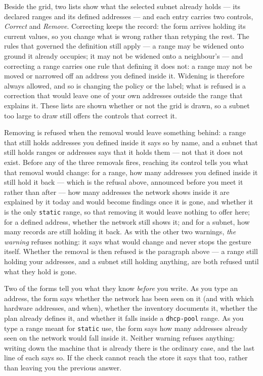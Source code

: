 \documentclass[11pt,oneside,listof=totoc,bibliography=totoc]{scrreprt}
\begin{document}
Beside the grid, two lists show what the selected subnet already holds --- its declared ranges and
its defined addresses --- and each entry carries two controls, \emph{Correct} and \emph{Remove}.
Correcting keeps the record: the form arrives holding its current values, so you change what is
wrong rather than retyping the rest. The rules that governed the definition still apply --- a range
may be widened onto ground it already occupies; it may not be widened onto a neighbour's --- and
correcting a range carries one rule that defining it does not: a range may not be moved or narrowed
off an address you defined inside it. Widening is therefore always allowed, and so is changing the
policy or the label; what is refused is a correction that would leave one of your own addresses
outside the range that explains it. These lists are
shown whether or not the grid is drawn, so a subnet too large to draw still offers the controls that
correct it.

Removing is refused when the removal would leave something behind: a range that still holds
addresses you defined inside it says so by name, and a subnet that still holds ranges or addresses
says that it holds them --- not that it does not exist. Before any of the three removals fires,
reaching its control tells you what that removal would change: for a range, how many addresses you
defined inside it still hold it back --- which is the refusal above, announced before you meet it
rather than after --- how many addresses the network shows inside it are explained by it today and
would become findings once it is gone, and whether it is the only \texttt{static} range, so that
removing it would leave nothing to offer here; for a defined address, whether the network still
shows it; and for a subnet, how many records are still holding it back. As with the other two
warnings, \emph{the warning} refuses nothing: it says what would change and never stops the gesture
itself. Whether the removal is then refused is the paragraph above --- a range still holding your
addresses, and a subnet still holding anything, are both refused until what they hold is gone.

Two of the forms tell you what they know \emph{before} you write. As you type an address, the form
says whether the network has been seen on it (and with which hardware addresses, and when), whether
the inventory documents it, whether the plan already defines it, and whether it falls inside a
\texttt{dhcp-pool} range. As you type a range meant for \texttt{static} use, the form says how many
addresses already seen on the network would fall inside it. Neither warning refuses anything: writing
down the machine that is already there is the ordinary case, and the last line of each says so. If
the check cannot reach the store it says that too, rather than leaving you the previous answer.
\end{document}
